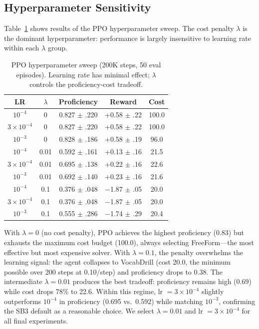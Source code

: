 \documentclass{article}
\begin{document}
\subsection{Hyperparameter Sensitivity}

Table~\ref{tab:sweep} shows results of the PPO hyperparameter sweep. The cost penalty $\lambda$ is the dominant hyperparameter: performance is largely insensitive to learning rate within each $\lambda$ group.

\begin{table}[h]
\vspace{-0.5em}
\centering
\small
\caption{PPO hyperparameter sweep (200K steps, 50 eval episodes). Learning rate has minimal effect; $\lambda$ controls the proficiency-cost tradeoff.}
\label{tab:sweep}
\vspace{0.3em}
\begin{tabular}{@{}ccccc@{}}
\toprule
LR & $\lambda$ & Proficiency & Reward & Cost \\
\midrule
$10^{-4}$ & 0    & 0.827 $\pm$ .220 & +0.58 $\pm$ .22 & 100.0 \\
$3\!\times\!10^{-4}$ & 0    & 0.827 $\pm$ .220 & +0.58 $\pm$ .22 & 100.0 \\
$10^{-3}$ & 0    & 0.828 $\pm$ .186 & +0.58 $\pm$ .19 & 96.0 \\
\midrule
$10^{-4}$ & 0.01 & 0.592 $\pm$ .161 & +0.13 $\pm$ .16 & 21.5 \\
$3\!\times\!10^{-4}$ & 0.01 & 0.695 $\pm$ .138 & +0.22 $\pm$ .16 & 22.6 \\
$10^{-3}$ & 0.01 & 0.692 $\pm$ .140 & +0.23 $\pm$ .16 & 21.6 \\
\midrule
$10^{-4}$ & 0.1  & 0.376 $\pm$ .048 & $-$1.87 $\pm$ .05 & 20.0 \\
$3\!\times\!10^{-4}$ & 0.1  & 0.376 $\pm$ .048 & $-$1.87 $\pm$ .05 & 20.0 \\
$10^{-3}$ & 0.1  & 0.555 $\pm$ .286 & $-$1.74 $\pm$ .29 & 20.4 \\
\bottomrule
\end{tabular}
\vspace{-0.5em}
\end{table}

With $\lambda\!=\!0$ (no cost penalty), PPO achieves the highest proficiency (0.83) but exhausts the maximum cost budget (100.0), always selecting FreeForm---the most effective but most expensive solver. With $\lambda\!=\!0.1$, the penalty overwhelms the learning signal: the agent collapses to VocabDrill (cost 20.0, the minimum possible over 200 steps at 0.10/step) and proficiency drops to 0.38. The intermediate $\lambda\!=\!0.01$ produces the best tradeoff: proficiency remains high (0.69) while cost drops 78\% to 22.6. Within this regime, lr $= 3\!\times\!10^{-4}$ slightly outperforms $10^{-4}$ in proficiency (0.695 vs.\ 0.592) while matching $10^{-3}$, confirming the SB3 default as a reasonable choice. We select $\lambda\!=\!0.01$ and lr $= 3\!\times\!10^{-4}$ for all final experiments.
\end{document}
